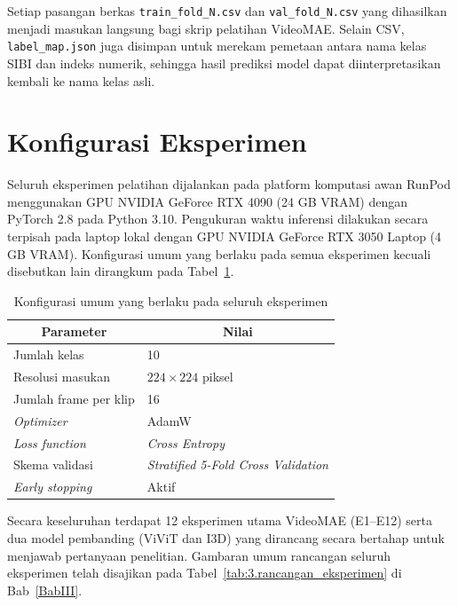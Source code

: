 Setiap pasangan berkas \texttt{train\_fold\_N.csv} dan \texttt{val\_fold\_N.csv} yang dihasilkan menjadi masukan langsung bagi skrip pelatihan VideoMAE. Selain CSV, \texttt{label\_map.json} juga disimpan untuk merekam pemetaan antara nama kelas SIBI dan indeks numerik, sehingga hasil prediksi model dapat diinterpretasikan kembali ke nama kelas asli.\par

\section{Konfigurasi Eksperimen} \label{IV.Konfigurasi}

Seluruh eksperimen pelatihan dijalankan pada platform komputasi awan RunPod menggunakan GPU NVIDIA GeForce RTX 4090 (24 GB VRAM) dengan PyTorch 2.8 pada Python 3.10. Pengukuran waktu inferensi dilakukan secara terpisah pada laptop lokal dengan GPU NVIDIA GeForce RTX 3050 Laptop (4 GB VRAM). Konfigurasi umum yang berlaku pada semua eksperimen kecuali disebutkan lain dirangkum pada Tabel~\ref{tab:4.umum_config}.\par

\begin{table}[H]
\centering
\caption{Konfigurasi umum yang berlaku pada seluruh eksperimen}
\label{tab:4.umum_config}
{\setlength{\tabcolsep}{3pt}
\footnotesize
\begin{tabular}{|l|l|}
\hline
\multicolumn{1}{|c|}{\textbf{Parameter}} & \multicolumn{1}{c|}{\textbf{Nilai}} \\
\hline
Jumlah kelas              & 10 \\
\hline
Resolusi masukan          & $224\times224$ piksel \\
\hline
Jumlah frame per klip     & 16 \\
\hline
\textit{Optimizer}        & AdamW \\
\hline
\textit{Loss function}    & \textit{Cross Entropy} \\
\hline
Skema validasi            & \textit{Stratified 5-Fold Cross Validation} \\
\hline
\textit{Early stopping}   & Aktif \\
\hline
\end{tabular}
}
\end{table}

Secara keseluruhan terdapat 12 eksperimen utama VideoMAE (E1--E12) serta dua model pembanding (ViViT dan I3D) yang dirancang secara bertahap untuk menjawab pertanyaan penelitian. Gambaran umum rancangan seluruh eksperimen telah disajikan pada Tabel~\ref{tab:3.rancangan_eksperimen} di Bab~\ref{BabIII}.\par

